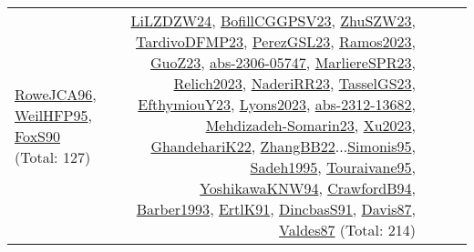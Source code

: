 {\begin{longtable}{p{3cm}r>{\raggedright\arraybackslash}p{6cm}>{\raggedright\arraybackslash}p{6cm}>{\raggedright\arraybackslash}p{8cm}}
\hyperref[detail:RoweJCA96]{RoweJCA96}, \hyperref[detail:WeilHFP95]{WeilHFP95}, \hyperref[detail:FoxS90]{FoxS90} (Total: 127) & \hyperref[detail:LiLZDZW24]{LiLZDZW24}, \hyperref[detail:BofillCGGPSV23]{BofillCGGPSV23}, \hyperref[detail:ZhuSZW23]{ZhuSZW23}, \hyperref[detail:TardivoDFMP23]{TardivoDFMP23}, \hyperref[detail:PerezGSL23]{PerezGSL23}, \hyperref[detail:Ramos2023]{Ramos2023}, \hyperref[detail:GuoZ23]{GuoZ23}, \hyperref[detail:abs-2306-05747]{abs-2306-05747}, \hyperref[detail:MarliereSPR23]{MarliereSPR23}, \hyperref[detail:Relich2023]{Relich2023}, \hyperref[detail:NaderiRR23]{NaderiRR23}, \hyperref[detail:TasselGS23]{TasselGS23}, \hyperref[detail:EfthymiouY23]{EfthymiouY23}, \hyperref[detail:Lyons2023]{Lyons2023}, \hyperref[detail:abs-2312-13682]{abs-2312-13682}, \hyperref[detail:Mehdizadeh-Somarin23]{Mehdizadeh-Somarin23}, \hyperref[detail:Xu2023]{Xu2023}, \hyperref[detail:GhandehariK22]{GhandehariK22}, \hyperref[detail:ZhangBB22]{ZhangBB22}...\hyperref[detail:Simonis95]{Simonis95}, \hyperref[detail:Sadeh1995]{Sadeh1995}, \hyperref[detail:Touraivane95]{Touraivane95}, \hyperref[detail:YoshikawaKNW94]{YoshikawaKNW94}, \hyperref[detail:CrawfordB94]{CrawfordB94}, \hyperref[detail:Barber1993]{Barber1993}, \hyperref[detail:ErtlK91]{ErtlK91}, \hyperref[detail:DincbasS91]{DincbasS91}, \hyperref[detail:Davis87]{Davis87}, \hyperref[detail:Valdes87]{Valdes87} (Total: 214)\\
\end{longtable}
}

\clearpage
